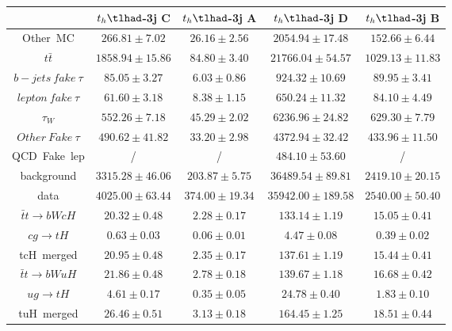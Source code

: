 \begin{tabular}{|c|c|c|c|c|} \hline
 & $t_{h}\tlhad$-3j C & $t_{h}\tlhad$-3j A & $t_{h}\tlhad$-3j D & $t_{h}\tlhad$-3j B\\\hline
Other~MC & $266.81\pm7.02$ & $26.16\pm2.56$ & $2054.94\pm17.48$ & $152.66\pm6.44$\\\hline
$t\bar{t}$ & $1858.94\pm15.86$ & $84.80\pm3.40$ & $21766.04\pm54.57$ & $1029.13\pm11.83$\\\hline
$b-jets~fake~\tau$ & $85.05\pm3.27$ & $6.03\pm0.86$ & $924.32\pm10.69$ & $89.95\pm3.41$\\\hline
$lepton~fake~\tau$ & $61.60\pm3.18$ & $8.38\pm1.15$ & $650.24\pm11.32$ & $84.10\pm4.49$\\\hline
$\tau_{W}$ & $552.26\pm7.18$ & $45.29\pm2.02$ & $6236.96\pm24.82$ & $629.30\pm7.79$\\\hline
$Other~Fake~\tau$ & $490.62\pm41.82$ & $33.20\pm2.98$ & $4372.94\pm32.42$ & $433.96\pm11.50$\\\hline
QCD~Fake~lep &  / &  / & $484.10\pm53.60$ &  /\\\hline
background & $3315.28\pm46.06$ & $203.87\pm5.75$ & $36489.54\pm89.81$ & $2419.10\pm20.15$\\\hline
data & $4025.00\pm63.44$ & $374.00\pm19.34$ & $35942.00\pm189.58$ & $2540.00\pm50.40$\\\hline
$\bar{t}t\to bWcH$ & $20.32\pm0.48$ & $2.28\pm0.17$ & $133.14\pm1.19$ & $15.05\pm0.41$\\\hline
$cg\to tH$ & $0.63\pm0.03$ & $0.06\pm0.01$ & $4.47\pm0.08$ & $0.39\pm0.02$\\\hline
tcH~merged & $20.95\pm0.48$ & $2.35\pm0.17$ & $137.61\pm1.19$ & $15.44\pm0.41$\\\hline
$\bar{t}t\to bWuH$ & $21.86\pm0.48$ & $2.78\pm0.18$ & $139.67\pm1.18$ & $16.68\pm0.42$\\\hline
$ug\to tH$ & $4.61\pm0.17$ & $0.35\pm0.05$ & $24.78\pm0.40$ & $1.83\pm0.10$\\\hline
tuH~merged & $26.46\pm0.51$ & $3.13\pm0.18$ & $164.45\pm1.25$ & $18.51\pm0.44$\\\hline
\end{tabular}
